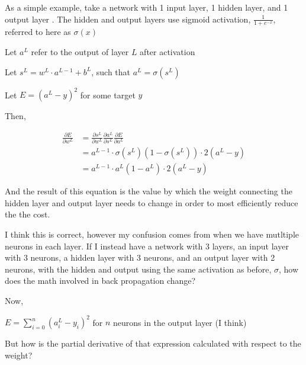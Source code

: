 \documentclass{article}
\begin{document}
As a simple example, take a network with 1 input layer, 1 hidden layer, and 1 output layer
. The hidden and output layers use sigmoid activation, $\frac{1}{1 + e^{-x}}$, referred to
here as $\sigma (x)$

Let $a^L$ refer to the output of layer $L$ after activation

Let $s^L = w^L \cdot a^{L-1} + b^L$, such that $a^L=\sigma (s^L)$

Let $E = (a^L - y)^2$ for some target $y$

Then,

\begin{equation*}
	\begin{split}
	\frac{\partial E}{\partial w^L} 
	&= 
	\frac{\partial s^L}{\partial w^L} 
	\frac{\partial a^L}{\partial s^L} 
	\frac{\partial E}{\partial a^L} \\
	&= 
	a^{L-1}\cdot \sigma(s^L)(1 - \sigma (s^L)) \cdot 2(a^L - y) \\
	&=
	a^{L-1}\cdot a^L(1 - a^L) \cdot 2(a^L - y)
	\end{split}
\end{equation*}

And the result of this equation is the value by which the weight connecting the hidden
layer and output layer needs to change in order to most efficiently reduce the the cost.

I think this is correct, however my confusion comes from when we have mutltiple neurons
in each layer. If I instead have a network with 3 layers, an input layer with 3 neurons,
a hidden layer with 3 neurons, and an output layer with 2 neurons, with the hidden and
output using the same activation as before, $\sigma$, how does the math involved in 
back propagation change?

Now, 

$E = \sum_ {i=0} ^ n (a^{L}_i - y_i)^2$ for $n$ neurons in the output layer (I think)

But how is the partial derivative of that expression calculated with respect to the 
weight?
\end{document}
